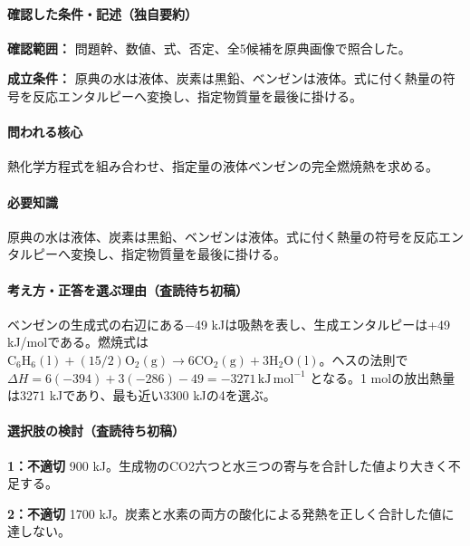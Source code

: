 \paragraph{確認した条件・記述（独自要約）}\mbox{}\par

\noindent\textbf{確認範囲：} 問題幹、数値、式、否定、全5候補を原典画像で照合した。\par

\noindent\textbf{成立条件：} 原典の水は液体、炭素は黒鉛、ベンゼンは液体。式に付く熱量の符号を反応エンタルピーへ変換し、指定物質量を最後に掛ける。\par

\paragraph{問われる核心} 熱化学方程式を組み合わせ、指定量の液体ベンゼンの完全燃焼熱を求める。

\paragraph{必要知識} 原典の水は液体、炭素は黒鉛、ベンゼンは液体。式に付く熱量の符号を反応エンタルピーへ変換し、指定物質量を最後に掛ける。

\paragraph{考え方・正答を選ぶ理由（査読待ち初稿）} ベンゼンの生成式の右辺にある−49 kJは吸熱を表し、生成エンタルピーは+49 kJ/molである。燃焼式は \(\mathrm{C_6H_6(l)}+(15/2)\mathrm{O_2(g)}\to6\mathrm{CO_2(g)}+3\mathrm{H_2O(l)}\)。ヘスの法則で \(\Delta H=6(-394)+3(-286)-49=-3271\,\mathrm{kJ\,mol^{-1}}\) となる。1 molの放出熱量は3271 kJであり、最も近い3300 kJの4を選ぶ。

\paragraph{選択肢の検討（査読待ち初稿）}\mbox{}\par

\noindent\textbf{1：不適切} 900 kJ。生成物のCO2六つと水三つの寄与を合計した値より大きく不足する。\par

\noindent\textbf{2：不適切} 1700 kJ。炭素と水素の両方の酸化による発熱を正しく合計した値に達しない。\par

